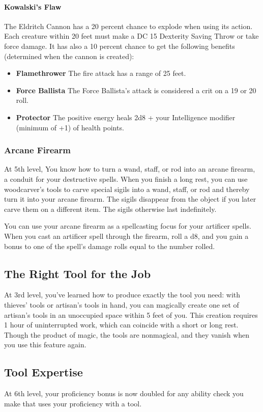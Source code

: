 {\paragraph*{Kowalski's Flaw}
The Eldritch Cannon has a  20 percent chance to explode when using its action. Each creature within 20 feet must make a DC 15 Dexterity Saving Throw or take  force damage. It has also a 10 percent chance to get the following  benefits (determined when the cannon is created):
\begin{itemize}
	\item \textbf{Flamethrower} The fire attack has a range of 25 feet.
	\item \textbf{Force Ballista} The Force Ballista's attack is considered a crit on a 19 or 20 roll.
	\item \textbf{Protector} The positive energy heals 2d8 + your Intelligence modifier (minimum of +1) of health points.
\end{itemize}
\subsubsection*{Arcane Firearm}
At 5th level, You know how to turn a wand, staff, or rod into an arcane firearm, a conduit for your destructive spells. When you finish a long rest, you can use woodcarver's tools to carve special sigils into a wand, staff, or rod and thereby turn it into your arcane firearm. The sigils disappear from the object if you later carve them on a different item. The sigils otherwise last indefinitely.

You can use your arcane firearm as a spellcasting focus for your artificer spells. When you cast an artificer spell through the firearm, roll a d8, and you gain a bonus to one of the spell's damage rolls equal to the number rolled.
\subsection*{The Right Tool for the Job}
At 3rd level, you've learned how to produce exactly the tool you need: with thieves' tools or artisan's tools in hand, you can magically create one set of artisan's tools in an unoccupied space within 5 feet of you. This creation requires 1 hour of uninterrupted work, which can coincide with a short or long rest. Though the product of magic, the tools are nonmagical, and they vanish when you use this feature again.
\subsection*{Tool Expertise}
At 6th level, your proficiency bonus is now doubled for any ability check you make that uses your proficiency with a tool.
}
